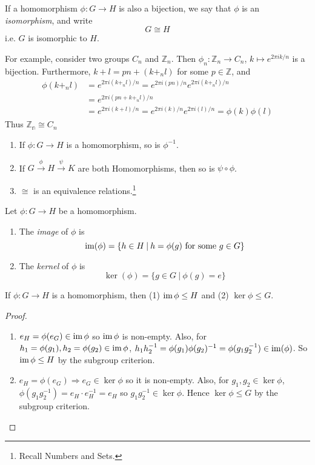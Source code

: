 \documentclass[10pt, a4paper, twoside]{report}
\begin{document}
\begin{definition}
    If a homomorphism \(\phi:G\to H\) is also a bijection, we say that \(\phi\) is an \emph{isomorphism}, and write 
    \[G\cong H\]
    i.e. \(G\) is isomorphic to \(H\).
\end{definition}
For example, consider two groups \(C_n\) and \(\mathbb{Z}_n\). Then \(\phi_n:\mathbb{Z}_n\to C_n\), \(k\mapsto e^{2\pi ik/n}\) is a bijection. Furthermore, \(k+l=pn+(k+_nl)\) for some \(p\in\mathbb{Z}\), and 
\begin{align*}
    \phi(k+_nl)&=e^{2\pi i(k+_nl)/n}=e^{2\pi i(pn)/n}e^{2\pi i(k+_nl)/n} \\
    &=e^{2\pi i(pn+k+_nl)/n} \\
    &=e^{2\pi i(k+l)/n}=e^{2\pi i(k)/n}e^{2\pi i(l)/n}=\phi(k)\phi(l)
\end{align*}
Thus \(\mathbb{Z_n}\cong{C_n}\)
\begin{lemma} \item[]
    \begin{enumerate}
        \item If \(\phi:G\to H\) is a homomorphism, so is \(\phi^{-1}\).
        \item If \(G\xrightarrow{\phi}H\xrightarrow{\psi}K\) are both Homomorphisms, then so is \(\psi\circ\phi\).
        \item \(\cong\) is an equivalence relations.\footnote{Recall Numbers and Sets.}
    \end{enumerate}
\end{lemma}
\begin{definition}
    Let \(\phi:G\to H\) be a homomorphism. 
    \begin{enumerate}
        \item The \emph{image} of \(\phi\) is 
        \[\operatorname{im}(\phi)=\{h\in H\:|\:h=\phi(g)\text{  for some \(g\in G\)}\}\]
        \item The \emph{kernel} of \(\phi\) is 
        \[\ker(\phi)=\{g\in G\:|\:\phi(g)=e\}\]
    \end{enumerate}
\end{definition}
\begin{proposition}
    If \(\phi:G\to H\) is a homomorphism, then (1) \(\operatorname{im}\phi\leq H\) and (2) \(\ker\phi\leq G\).
\end{proposition}
\begin{proof} \item[] 
    \begin{enumerate}
        \item \(e_H=\phi(e_G)\in\operatorname{im}\phi\) so \(\operatorname{im}\phi\) is non-empty. Also, for \(h_1=\phi(g_1),h_2=\phi(g_2)\in\operatorname{im}\phi\), \(h_1h_2^{-1}=\phi(g_1)\phi(g_2)^{-1}=\phi(g_1g_2^{-1})\in\operatorname{im}(\phi)\). So \(\operatorname{im}\phi\leq H\) by the subgroup criterion.
        \item \(e_H=\phi(e_G)\Rightarrow e_G\in\ker\phi\) so it is non-empty. Also, for \(g_1,g_2\in\ker\phi\), \(\phi(g_1g_2^{-1})=e_H\cdot e_H^{-1}=e_H\) so \(g_1g_2^{-1}\in\ker\phi\). Hence \(\ker\phi\leq G\) by the subgroup criterion.
    \end{enumerate}
\end{proof}
\end{document}
